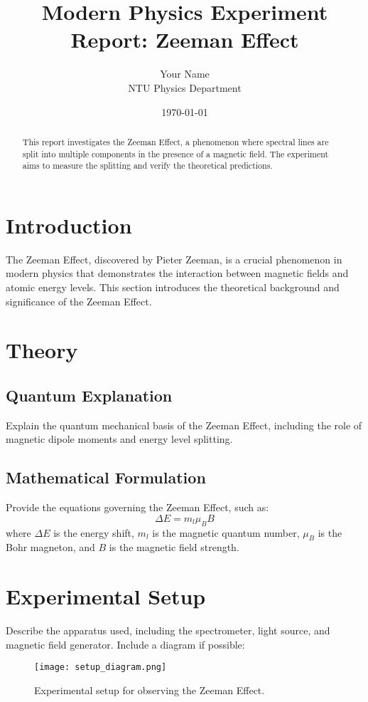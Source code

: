 \documentclass[a4paper,12pt]{article}
\title{Modern Physics Experiment Report: Zeeman Effect}
\author{Your Name \\ NTU Physics Department}
\date{\today}
\begin{document}
\maketitle

\begin{abstract}
This report investigates the Zeeman Effect, a phenomenon where spectral lines are split into multiple components in the presence of a magnetic field. The experiment aims to measure the splitting and verify the theoretical predictions. 
\end{abstract}

\tableofcontents
\newpage

\section{Introduction}
The Zeeman Effect, discovered by Pieter Zeeman, is a crucial phenomenon in modern physics that demonstrates the interaction between magnetic fields and atomic energy levels. This section introduces the theoretical background and significance of the Zeeman Effect.

\section{Theory}
\subsection{Quantum Explanation}
Explain the quantum mechanical basis of the Zeeman Effect, including the role of magnetic dipole moments and energy level splitting.

\subsection{Mathematical Formulation}
Provide the equations governing the Zeeman Effect, such as:
\[
\Delta E = m_l \mu_B B
\]
where \( \Delta E \) is the energy shift, \( m_l \) is the magnetic quantum number, \( \mu_B \) is the Bohr magneton, and \( B \) is the magnetic field strength.

\section{Experimental Setup}
Describe the apparatus used, including the spectrometer, light source, and magnetic field generator. Include a diagram if possible:
\begin{figure}[H]
    \centering
    \texttt{[image: setup\_diagram.png]}
    \caption{Experimental setup for observing the Zeeman Effect.}
    \label{fig:setup}
\end{figure}
\end{document}
